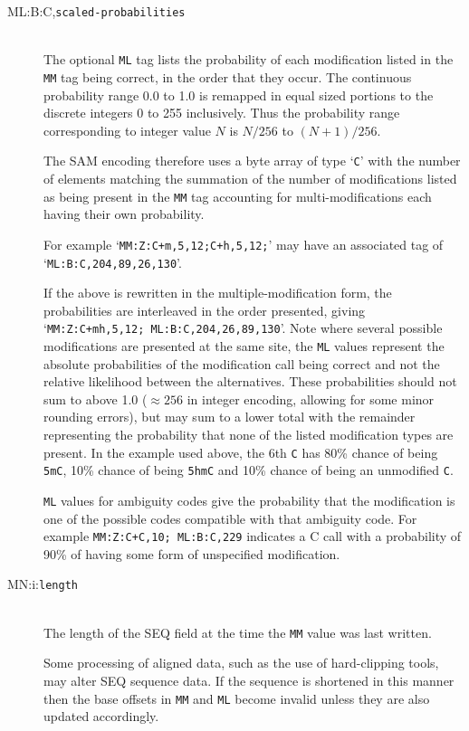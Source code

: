 \documentclass[10pt]{article}
\newcommand{\tagvalue}[1]{{\tt #1}}
\begin{document}
\begin{description}
\item[ML:B:C,\tagvalue{scaled-probabilities}]
\hfill\\
The optional {\tt ML} tag lists the probability of each modification listed in the {\tt MM} tag being correct, in the order that they occur.
The continuous probability range 0.0 to 1.0 is remapped in equal
sized portions to the discrete integers 0 to 255 inclusively. Thus the
probability range corresponding to integer value $N$ is $N/256$ to
$(N+1)/256$.

The SAM encoding therefore uses a byte array of type `{\tt C}' with the number of elements matching the summation of the number of modifications listed as being present in the {\tt MM} tag accounting for multi-modifications each having their own probability.

For example `{\tt MM:Z:C+m,5,12;C+h,5,12;}' may have an associated tag of `{\tt ML:B:C,204,89,26,130}'.

If the above is rewritten in the multiple-modification form, the probabilities are interleaved in the order presented, giving `{\tt MM:Z:C+mh,5,12;  ML:B:C,204,26,89,130}'.
Note where several possible modifications are presented at the same site, the {\tt ML} values represent the absolute probabilities of the modification call being correct and not the relative likelihood between the alternatives.
These probabilities should not sum to above 1.0 ($\approx 256$ in integer encoding, allowing for some minor rounding errors), but may sum to a lower total with the remainder representing the probability that none of the listed modification types are present.
In the example used above, the 6th {\tt C} has 80\% chance of being {\tt 5mC}, 10\% chance of being {\tt 5hmC} and 10\% chance of being an unmodified {\tt C}.

{\tt ML} values for ambiguity codes give the probability that the modification is one of the possible codes compatible with that ambiguity code.
For example {\tt MM:Z:C+C,10; ML:B:C,229} indicates a C call with a probability of 90\% of having some form of unspecified modification.

\item[MN:i:\tagvalue{length}]
\hfill\\
The length of the {\sf SEQ} field at the time the {\tt MM} value was last written.

Some processing of aligned data, such as the use of hard-clipping tools, may alter {\sf SEQ} sequence data.
If the sequence is shortened in this manner then the base offsets in {\tt MM} and {\tt ML} become invalid unless they are also updated accordingly.


\end{description}
\end{document}

